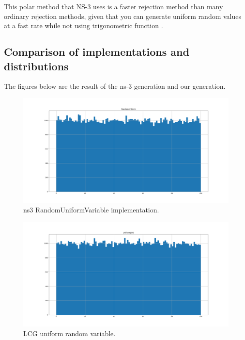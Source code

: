 \documentclass{article}
\begin{document}
  This polar method that NS-3 uses is a faster rejection method than many ordinary rejection methods, given that you can generate uniform random values at a fast rate while not using trigonometric function \cite{bm}. 
  \subsection{Comparison of implementations and distributions}
  The figures below are the result of the ns-3 generation and our generation.
  \begin{figure}[h!]
    \centering
    \includegraphics[width=\linewidth]{ns3uniform.png}
    \caption{ns3 RandomUniformVariable implementation.}
    \label{fig:ns-3ruv}
  \end{figure}
  
  \begin{figure}[h!]
    \centering
    \includegraphics[width=\linewidth]{uniformLCG.png}
    \caption{LCG uniform random variable.}
    \label{fig:lcgruv}
  \end{figure}
\end{document}
